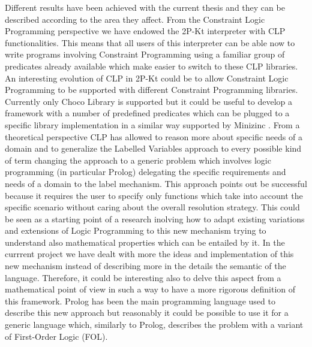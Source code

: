 Different results have been achieved with the current thesis and they can be described according to the area they affect.\newline\newline
From the Constraint Logic Programming perspective we have endowed the 2P-Kt interpreter with CLP functionalities. This means that all users of this interpreter
can be able now to write programs involving Constraint Programming using a familiar group of predicates already available which
make easier to switch to these CLP libraries. An interesting evolution of CLP in 2P-Kt could be to allow Constraint Logic Programming to be supported
with different Constraint Programming libraries. Currently only Choco Library is supported but it could be useful to develop a framework with a number of predefined predicates
which can be plugged to a specific library implementation in a similar way supported by Minizinc \cite{10.1007/978-3-540-74970-7_38}.\newline\newline
From a theoretical perspective CLP has allowed to reason more about specific needs of a domain and to generalize the Labelled Variables approach
to every possible kind of term changing the approach to a generic problem which involves logic programming (in particular Prolog) delegating the specific requirements
and needs of a domain to the label mechanism. This approach points out be successful because it requires the user to specify only
functions which take into account the specific scenario without caring about the overall resolution strategy.\newline
This could be seen as a starting point of a research inolving how to adapt existing variations
and extensions of Logic Programming to this new mechanism trying to understand also mathematical properties which can be entailed by it.\newline
In the currrent project we have dealt with more the ideas and implementation of this new mechanism instead of describing more in the details
the semantic of the language. Therefore, it could be interesting also to delve this aspect from a mathematical point of view in such a way to have a more
rigorous definition of this framework.\newline\newline
Prolog has been the main programming language used to describe this new approach but reasonably it could be possible to use it for a generic language which,
similarly to Prolog, describes the problem with a variant of First-Order Logic (FOL).